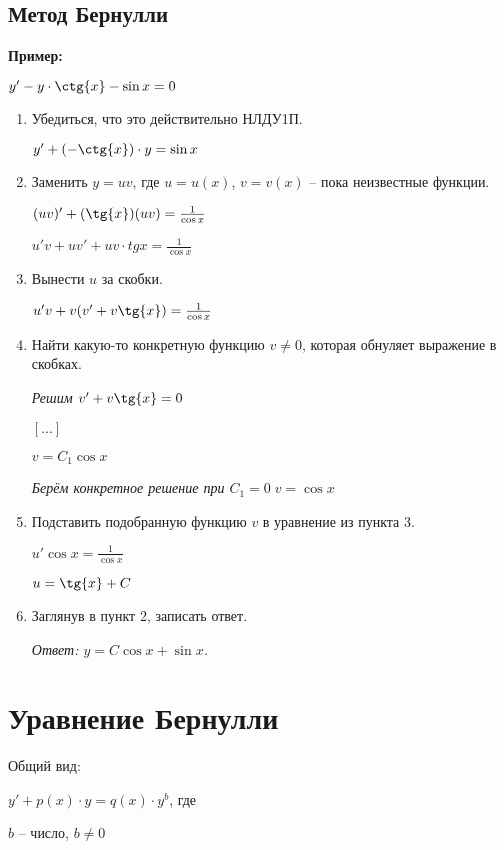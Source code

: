 \documentclass[10pt, a4paper]{article}
\begin{document}
\subsection{Метод Бернулли}
\textbf{Пример:}
\par $y' - y \cdot \ctg{x} - \sin{x} = 0$
\begin{enumerate}
    \item Убедиться, что это действительно НЛДУ1П.
        \par $y' + (-\ctg{x}) \cdot y = \sin{x}$
    \item Заменить $y = uv$, где $u = u(x)$, $v = v(x)$ -- пока неизвестные функции.
        \par $(uv)' + (\tg{x})(uv) = \frac{1}{\cos{x}}$
        \par $u'v + uv' + uv \cdot tg{x} = \frac{1}{\cos{x}}$
    \item Вынести $u$ за скобки.
        \par $u'v + v(v' + v\tg{x}) = \frac{1}{\cos{x}}$
    \item Найти какую-то конкретную функцию $v \neq 0$, которая обнуляет выражение в скобках.
        \par \textit{Решим $v' + v\tg{x} = 0$}
        \par $[...]$
        \par $v = C_{1}\cos{x}$
        \par \textit{Берём конкретное решение при $C_{1} = 0 \; v = \cos{x}$}
    \item Подставить подобранную функцию $v$ в уравнение из пункта 3.
        \par $u'\cos{x} = \frac{1}{\cos{x}}$
        \par $u = \tg{x} + C$
    \item Заглянув в пункт 2, записать ответ.
        \par\textit{Ответ: $y = C\cos{x} + \sin{x}$.}
\end{enumerate}


\section{Уравнение Бернулли}
Общий вид:
\par $y' + p(x) \cdot y = q(x) \cdot y^b$, где
\par $b$ -- число, $b \neq 0$
\end{document}
